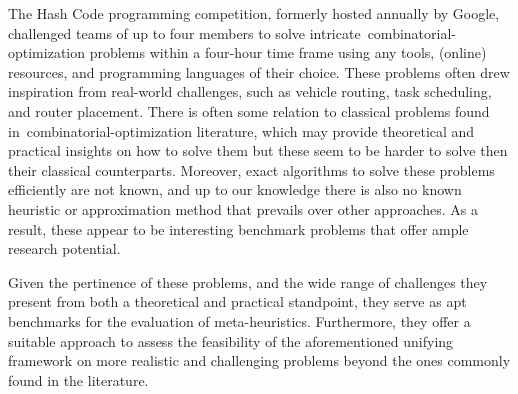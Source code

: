 The Hash Code programming competition, formerly hosted annually by Google,
challenged teams of up to four members to solve
intricate~\acrshort{combinatorial-optimization} problems within a four-hour time
frame using any tools, (online) resources, and programming languages of their
choice. These problems often drew inspiration from real-world challenges, such
as vehicle routing, task scheduling, and router placement. There is often some
relation to classical problems found in~\acrshort{combinatorial-optimization}
literature, which may provide theoretical and practical insights on how to solve
them but these seem to be harder to solve then their classical counterparts.
Moreover, exact algorithms to solve these problems efficiently are not known,
and up to our knowledge there is also no known heuristic or approximation method
that prevails over other approaches. As a result, these appear to be interesting
benchmark problems that offer ample research potential.

Given the pertinence of these problems, and the wide range of challenges they
present from both a theoretical and practical standpoint, they serve as apt
benchmarks for the evaluation of meta-heuristics. Furthermore, they offer a
suitable approach to assess the feasibility of the aforementioned unifying
framework on more realistic and challenging problems beyond the ones commonly
found in the literature.